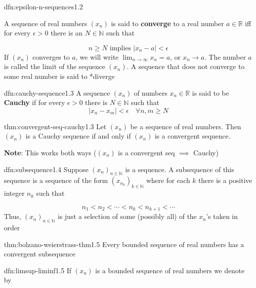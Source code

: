 \documentclass[landscape, 8pt]{extarticle}
\begin{document}
\begin{multicols}{3}
\begin{dfn}{dfn:epsilon-n-sequences}{1.2}

	A sequence of real numbers $(x_{n})$ is said to \textbf{converge} to a real number $a\in \mathbb{R}$ iff for every $\epsilon>0$ there is an $N\in\mathbb{N}$ such that

	\[n\ge N \text{ implies } \lvert x_{n} - a \rvert < \epsilon\]
	If $(x_{n})$ converges to $a$, we will write $\displaystyle\lim_{n \to \infty} x_{n}=a$, or $x_{n}\to a$. The number $a$ is called the limit of the sequence $(x_{n})$. A sequence that does not converge to some real number is said to *diverge
\end{dfn}

\begin{dfn}{dfn:cauchy-sequence}{1.3}
	A sequence $(x_{n})$ of numbers $x_{n} \in \mathbb{R}$ is said to be \textbf{Cauchy} if for every $\epsilon > 0$ there is $N\in \mathbb{N}$ such that
	\[\lvert x_{n} - x_{m} \rvert < \epsilon \quad \forall n,m\ge N\]
\end{dfn}

\begin{thm}{thm:convergent-seq-cauchy}{1.3}
	Let $(x_{n})$ be a sequence of real numbers. Then $(x_{n})$ is a Cauchy sequence if and only if $(x_{n})$ is a convergent sequence.

	\textbf{Note}: This works both ways ($(x_{n})$ is a convergent seq $\implies$ Cauchy)
\end{thm}

\begin{dfn}[Subsequences]{dfn:subsequence}{1.4}
	Suppose $(x_{n})_{n\in\mathbb{N}}$ is a sequence. A subsequence of this sequence is a sequence of the form $(x_{n_{k}})_{k\in\mathbb{N}}$ where for each $k$ there is a positive integer $n_{k}$ such that

	\[n_{1} < n_{2} < \cdots < n_{k} < n_{k+1} < \cdots\]
	Thus, $(x_{n})_{n\in\mathbb{N}}$ is just a selection of some (possibly all) of the $x_{n}$'s taken in order
\end{dfn}

\begin{thm}{thm:bolzano-weierstrass-thm}{1.5}
	Every bounded sequence of real numbers has a convergent subsequence
\end{thm}


\begin{dfn}{dfn:limsup-liminf}{1.5}
	If $(x_{n})$ is a bounded sequence of real numbers we denote by


\end{dfn}
\end{multicols}
\end{document}

